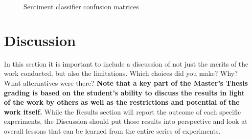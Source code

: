 \begin{figure}[t!]
    \centering
    \begin{subfigure}{\linewidth}
        \label{fig:conf_sentiment_2013}
    \end{subfigure}
    \caption{Sentiment classifier confusion matrices}
        \label{fig:conf_sentiment}
\end{figure}

\section{Discussion}
\label{sec:discussion}

In this section it is important to include a discussion of not just the merits of the work conducted, but also the limitations. 
Which choices did you make? Why? What alternatives were there?
{\color{red}\textbf{Note that a key part of the Master's Thesis grading is based on the student's ability to discuss the results in light of the work by others as well as the restrictions and potential of the work itself.}}
While the Results section will report the outcome of each specific experiments, the Discussion should put those results into perspective and look at overall lessons that can be learned from the entire series of experiments. 

